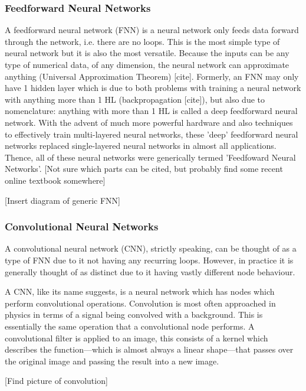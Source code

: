 \documentclass[a4paper,fleqn,usenatbib]{mnras}
\begin{document}
\subsubsection{Feedforward Neural Networks}
A feedforward neural network (FNN) is a neural network only feeds data forward through the network, i.e. there are no loops. This is the most simple type of neural network but it is also the most versatile. Because the inputs can be any type of numerical data, of any dimension, the neural network can approximate anything (Universal Approximation Theorem) [cite]. Formerly, an FNN may only have 1 hidden layer which is due to both problems with training a neural network with anything more than 1 HL (backpropagation [cite]), but also due to nomenclature: anything with more than 1 HL is called a deep feedforward neural network. With the advent of much more powerful hardware and also techniques to effectively train multi-layered neural networks, these 'deep' feedforward neural networks replaced single-layered neural networks in almost all applications. Thence, all of these neural networks were generically termed 'Feedfoward Neural Networks'.  [Not sure which parts can be cited, but probably find some recent online textbook somewhere]

[Insert diagram of generic FNN]

\subsubsection{Convolutional Neural Networks}
A convolutional neural network (CNN), strictly speaking, can be thought of as a type of FNN due to it not having any recurring loops. However, in practice it is generally thought of as distinct due to it having vastly different node behaviour. 

A CNN, like its name suggests, is a neural network which has nodes which perform convolutional operations. Convolution is most often approached in physics in terms of a signal being convolved with a background. This is essentially the same operation that a convolutional node performs. A convolutional filter is applied to an image, this consists of a kernel which describes the function---which is almost always a linear shape---that passes over the original image and passing the result into a new image. 

[Find picture of convolution]
\end{document}

